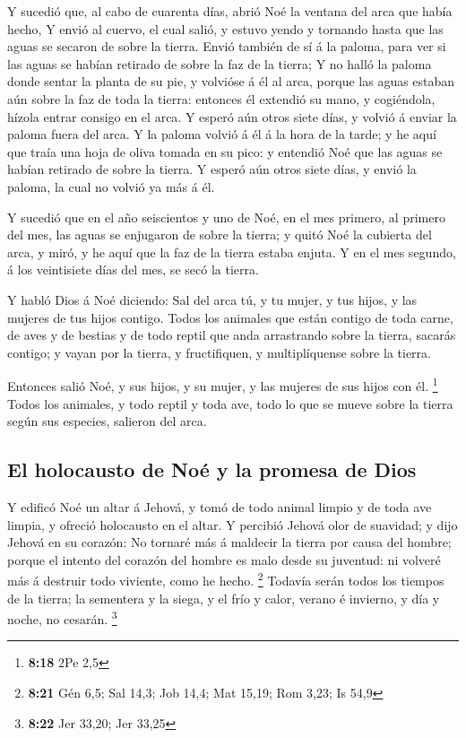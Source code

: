  Y sucedió que, al cabo de cuarenta días, abrió Noé la
ventana del arca que había hecho,  Y envió al cuervo, el
cual salió, y estuvo yendo y tornando hasta que las aguas se secaron de
sobre la tierra.  Envió también de sí á la paloma, para
ver si las aguas se habían retirado de sobre la faz de la tierra;
 Y no halló la paloma donde sentar la planta de su pie, y
volvióse á él al arca, porque las aguas estaban aún sobre la faz de toda
la tierra: entonces él extendió su mano, y cogiéndola, hízola entrar
consigo en el arca.  Y esperó aún otros siete días, y
volvió á enviar la paloma fuera del arca.  Y la paloma
volvió á él á la hora de la tarde; y he aquí que traía una hoja de oliva
tomada en su pico: y entendió Noé que las aguas se habían retirado de
sobre la tierra.  Y esperó aún otros siete días, y envió
la paloma, la cual no volvió ya más á él.

 Y sucedió que en el año seiscientos y uno de Noé, en el
mes primero, al primero del mes, las aguas se enjugaron de sobre la
tierra; y quitó Noé la cubierta del arca, y miró, y he aquí que la faz
de la tierra estaba enjuta.  Y en el mes segundo, á los
veintisiete días del mes, se secó la tierra.

 Y habló Dios á Noé diciendo:  Sal del
arca tú, y tu mujer, y tus hijos, y las mujeres de tus hijos contigo.
 Todos los animales que están contigo de toda carne, de
aves y de bestias y de todo reptil que anda arrastrando sobre la tierra,
sacarás contigo; y vayan por la tierra, y fructifiquen, y multiplíquense
sobre la tierra.

 Entonces salió Noé, y sus hijos, y su mujer, y las
mujeres de sus hijos con él. \footnote{\textbf{8:18} 2Pe 2,5}
 Todos los animales, y todo reptil y toda ave, todo lo
que se mueve sobre la tierra según sus especies, salieron del arca.

\hypertarget{el-holocausto-de-nouxe9-y-la-promesa-de-dios}{%
\subsection{El holocausto de Noé y la promesa de
Dios}\label{el-holocausto-de-nouxe9-y-la-promesa-de-dios}}

 Y edificó Noé un altar á Jehová, y tomó de todo animal
limpio y de toda ave limpia, y ofreció holocausto en el altar.
 Y percibió Jehová olor de suavidad; y dijo Jehová en su
corazón: No tornaré más á maldecir la tierra por causa del hombre;
porque el intento del corazón del hombre es malo desde su juventud: ni
volveré más á destruir todo viviente, como he hecho. \footnote{\textbf{8:21}
  Gén 6,5; Sal 14,3; Job 14,4; Mat 15,19; Rom 3,23; Is 54,9}
 Todavía serán todos los tiempos de la tierra; la
sementera y la siega, y el frío y calor, verano é invierno, y día y
noche, no cesarán. \footnote{\textbf{8:22} Jer 33,20; Jer 33,25}

